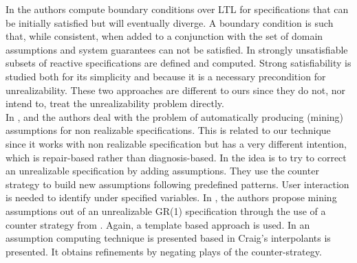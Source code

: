 In \cite{DBLP:conf/kbse/DegiovanniRACA16} the authors compute boundary conditions over LTL for specifications that can be initially satisfied but will eventually diverge.  A boundary condition is such that, while consistent, when added to a conjunction with the set of domain assumptions and system guarantees can not be satisfied.
In \cite{DBLP:conf/kbse/HagiharaESY14} strongly
unsatisfiable subsets of reactive specifications are defined and computed. Strong satisfiability is studied both for its simplicity and because it is a necessary precondition for unrealizability. These two approaches are different to ours since they do not, nor intend to, treat the unrealizability problem directly.\\
In \cite{DBLP:conf/fmcad/AlurMT13}, \cite{DBLP:conf/memocode/LiDS11} and
\cite{DBLP:conf/tacas/CavezzaA17} the authors deal with the problem of automatically producing 
(mining) assumptions for non realizable specifications.  This is related to our technique since it works with non realizable specification
but has a very different intention, which is repair-based rather than diagnosis-based.
In \cite{DBLP:conf/fmcad/AlurMT13} the idea is to try to correct an unrealizable specification by adding assumptions.  They use the counter strategy to build new assumptions following predefined patterns.  User interaction is needed to identify under specified variables.
In \cite{DBLP:conf/memocode/LiDS11}, the authors propose mining assumptions out of an unrealizable GR(1) specification through the use of a counter strategy from \cite{DBLP:conf/hvc/KonighoferHB10}. Again, a template based approach is used.
In \cite{DBLP:conf/tacas/CavezzaA17} an assumption computing technique is presented based in Craig's interpolants is presented.  It obtains refinements by negating plays of the counter-strategy.\\

